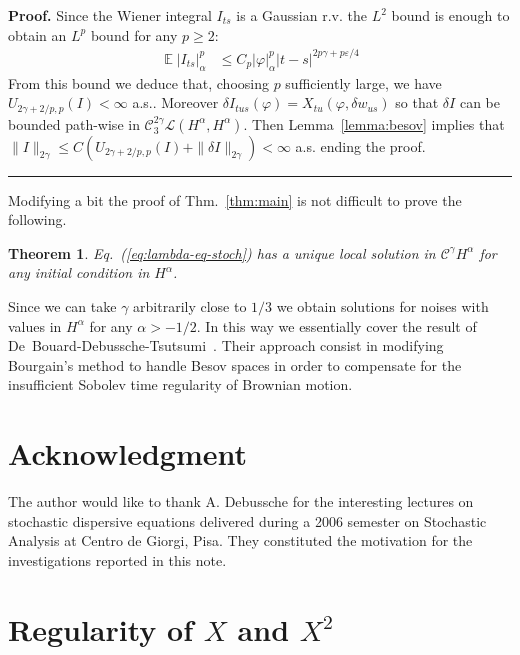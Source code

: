 \documentclass[a4paper,11pt,reqno]{article}
\DeclareMathOperator{\expect}{{\mathbb E}}
\newcommand{\eps}{\varepsilon}
\newcommand{\der}{\delta}
\newcommand{\CC}{\mathcal{C}}
\newcommand{\LL}{\mathcal{L}}
\newtheorem{theorem}{Theorem}
\newenvironment{proof}[1][Proof]{\textbf{#1.} }{\ \rule{0.5em}{0.5em}}
\begin{document}
\begin{proof}
Since the Wiener integral $I_{ts}$ is a Gaussian r.v.  the $L^2$ bound is
enough to obtain an $L^p$ bound for any $p\ge 2$:
\begin{equation*}
  \begin{split}
\expect \left|I_{ts}\right|^p_\alpha &  \le C_p  |\varphi|_\alpha^p |t-s|^{2p\gamma+p \eps /4}
  \end{split}
\end{equation*}
From this bound we deduce that, choosing $p$ sufficiently large, we
have $U_{2\gamma+2/p,p}(I) < \infty$ a.s.. Moreover $\der I_{tus}(\varphi)
= X_{tu}(\varphi,\der w_{us})$ so that $\der I$ can be bounded
path-wise in $\CC_3^{2\gamma} \LL(H^{\alpha},H^{\alpha})$.  
Then Lemma~\ref{lemma:besov} implies that 
$
\|I\|_{2\gamma} \le C(U_{2\gamma+2/p,p}(I)+\|\der I\|_{2\gamma}) < \infty
$ a.s.
ending the proof.
\end{proof}

Modifying a bit the proof of Thm.~\ref{thm:main} is not
difficult to prove the following.

\begin{theorem}
\label{th:eq-stoch}
Eq.~(\ref{eq:lambda-eq-stoch}) has a unique local solution in $\CC^\gamma H^\alpha$ for any initial
condition in $H^\alpha$.  
\end{theorem}

Since we can take $\gamma$ arbitrarily close to $1/3$ we obtain
solutions for noises with values in $H^\alpha$ for any  $\alpha > -1/2$.
In this way we essentially cover the result of
De~Bouard-Debussche-Tsutsumi~\cite{MR2111917}. Their approach consist
in modifying Bourgain's method to handle  Besov spaces in order to compensate
for the insufficient  Sobolev time regularity of Brownian motion.


\section*{Acknowledgment}
The author would like to thank A. Debussche for the interesting lectures on stochastic dispersive equations delivered during a 2006 semester on Stochastic Analysis at Centro de Giorgi, Pisa. They constituted the motivation for the investigations reported in this note.


\appendix
\section{Regularity of $X$ and $X^2$}
\label{sec:reg}
\end{document}
